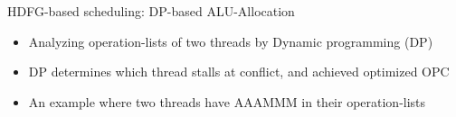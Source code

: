 \documentclass{beamer}
\begin{document}
\begin{CJK}{UTF8}{bkai}
    \begin{frame}{HDFG-based scheduling: DP-based ALU-Allocation}
        \begin{itemize}
            \item Analyzing operation-lists of two threads by Dynamic programming (DP)
            \item DP determines which thread stalls at conflict, and achieved optimized OPC
            \item An example where two threads have AAAMMM in their operation-lists
        \end{itemize}
        \begin{figure}[!ht]
            \begin{center}
                \hfill
                \hfill
            \end{center}
            \label{fig:alloc}
        \end{figure}
    \end{frame}


\end{CJK}
\end{document}
